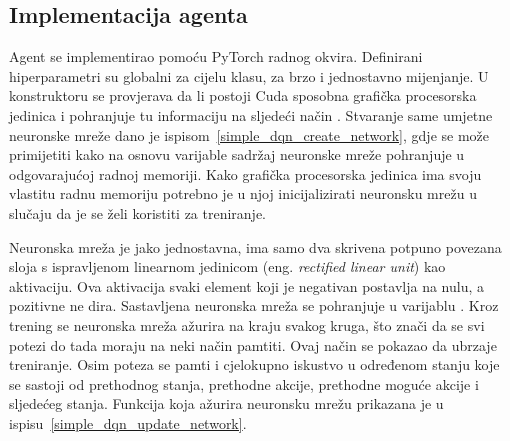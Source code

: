 \subsection{Implementacija agenta}
Agent se implementirao pomoću PyTorch radnog okvira. Definirani hiperparametri su globalni za cijelu klasu, za brzo i jednostavno mijenjanje. U konstruktoru se provjerava da li postoji Cuda sposobna grafička procesorska jedinica i pohranjuje tu informaciju na sljedeći način . Stvaranje same umjetne neuronske mreže dano je ispisom~\ref{simple_dqn_create_network}, gdje se može primijetiti kako na osnovu varijable  sadržaj neuronske mreže pohranjuje u odgovarajućoj radnoj memoriji. Kako grafička procesorska jedinica ima svoju vlastitu radnu memoriju potrebno je u njoj inicijalizirati neuronsku mrežu u slučaju da je se želi koristiti za treniranje.


Neuronska mreža je jako jednostavna, ima samo dva skrivena potpuno povezana sloja s ispravljenom linearnom jedinicom (eng. \textit{rectified linear unit}) kao aktivaciju. Ova aktivacija svaki element koji je negativan postavlja na nulu, a pozitivne ne dira. Sastavljena neuronska mreža se pohranjuje u varijablu . Kroz trening se neuronska mreža ažurira na kraju svakog kruga, što znači da se svi potezi do tada moraju na neki način pamtiti. Ovaj način se pokazao da ubrzaje treniranje. Osim poteza se pamti i cjelokupno iskustvo u određenom stanju koje se sastoji od prethodnog stanja, prethodne akcije, prethodne moguće akcije i sljedećeg stanja. Funkcija koja ažurira neuronsku mrežu prikazana je u ispisu~\ref{simple_dqn_update_network}.


